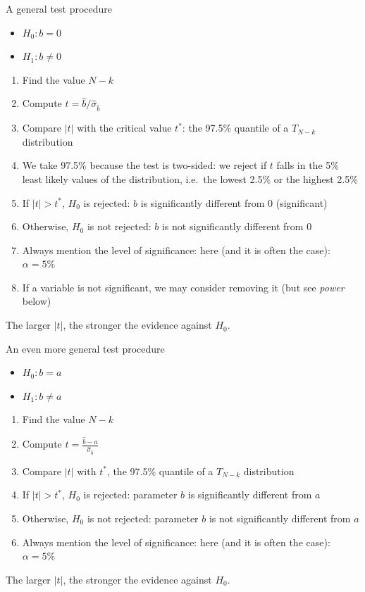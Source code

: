 \documentclass[aspectratio=169]{beamer}
\begin{document}
\begin{frame}{A general test procedure}
\begin{itemize}
    \item $H_0: b = 0$
    \item $H_1: b \neq 0$
\end{itemize}

\begin{enumerate}
    \item Find the value $N - k$
    \item Compute $t = \hat{b}/\hat{\sigma}_{\hat{b}}$
    \item Compare $|t|$ with the critical value $t^*$: the 97.5\% quantile of a $T_{N-k}$ distribution
    \item We take 97.5\% because the test is two-sided: we reject if $t$ falls in the 5\% least likely values of the distribution, i.e.\ the lowest 2.5\% or the highest 2.5\%
    \item If $|t| > t^*$, $H_0$ is rejected: $b$ is significantly different from 0 (significant)
    \item Otherwise, $H_0$ is not rejected: $b$ is not significantly different from 0
    \item Always mention the level of significance: here (and it is often the case): $\alpha = 5\%$
    \item If a variable is not significant, we may consider removing it (but see \textit{power} below)
\end{enumerate}

The larger $|t|$, the stronger the evidence against $H_0$.
\end{frame}

\begin{frame}{An even more general test procedure}
\begin{itemize}
    \item $H_0: b = a$
    \item $H_1: b \neq a$
\end{itemize}

\begin{enumerate}
    \item Find the value $N - k$
    \item Compute $t = \frac{\hat{b}-a}{\hat{\sigma}_{\hat{b}}}$
    \item Compare $|t|$ with $t^*$, the 97.5\% quantile of a $T_{N-k}$ distribution
    \item If $|t| > t^*$, $H_0$ is rejected: parameter $b$ is significantly different from $a$
    \item Otherwise, $H_0$ is not rejected: parameter $b$ is not significantly different from $a$
    \item Always mention the level of significance: here (and it is often the case): $\alpha = 5\%$
\end{enumerate}

The larger $|t|$, the stronger the evidence against $H_0$.
\end{frame}
\end{document}

